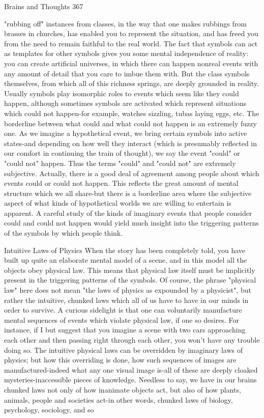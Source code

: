 Brains and Thoughts                                                                     367

"rubbing off" instances from classes, in the way that one makes rubbings from brasses in
churches, has enabled you to represent the situation, and has freed you from the need to
remain faithful to the real world. The fact that symbols can act as templates for other
symbols gives you some mental independence of reality: you can create artificial
universes, in which there can happen nonreal events with any amount of detail that you
care to imbue them with. But the class symbols themselves, from which all of this
richness springs, are deeply grounded in reality.
Usually symbols play isomorphic roles to events which seem like they could happen,
although sometimes symbols are activated which represent situations which could not
happen-for example, watches sizzling, tubas laying eggs, etc. The borderline between
what could and what could not happen is an extremely fuzzy one. As we imagine a
hypothetical event, we bring certain symbols into active states-and depending on how
well they interact (which is presumably reflected in our comfort in continuing the train of
thought), we say the event "could" or "could not" happen. Thus the terms "could" and
"could not" are extremely subjective. Actually, there is a good deal of agreement among
people about which events could or could not happen. This reflects the great amount of
mental structure which we all share-but there is a borderline area where the subjective
aspect of what kinds of hypothetical worlds we are willing to entertain is apparent. A
careful study of the kinds of imaginary events that people consider could and could not
happen would yield much insight into the triggering patterns of the symbols by which
people think.

                              Intuitive Laws of Physics
When the story has been completely told, you have built up quite an elaborate mental
model of a scene, and in this model all the objects obey physical law. This means that
physical law itself must be implicitly present in the triggering patterns of the symbols. Of
course, the phrase "physical law" here does not mean "the laws of physics as expounded
by a physicist", but rather the intuitive, chunked laws which all of us have to have in our
minds in order to survive.
A curious sidelight is that one can voluntarily manufacture mental sequences of events
which violate physical law, if one so desires. For instance, if I but suggest that you
imagine a scene with two cars approaching each other and then passing right through
each other, you won't have any trouble doing so. The intuitive physical laws can be
overridden by imaginary laws of physics; but how this overriding is done, how such
sequences of images are manufactured-indeed what any one visual image is-all of these
are deeply cloaked mysteries-inaccessible pieces of knowledge.
Needless to say, we have in our brains chunked laws not only of how inanimate objects
act, but also of how plants, animals, people and societies act-in other words, chunked
laws of biology, psychology, sociology, and so




